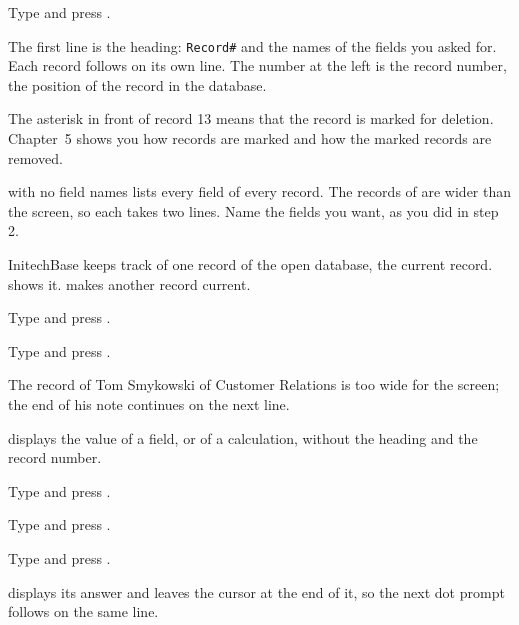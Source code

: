\begin{Steps}[resume]
\item Type  and press .
\end{Steps}
The first line is the heading: \texttt{Record\#} and the names of the fields
you asked for.  Each record follows on its own line.  The number at the left
is the record number, the position of the record in the database.

The asterisk in front of record 13 means that the record is marked for
deletion.  Chapter~5 shows you how records are marked and how the marked
records are removed.

\begin{AteNote}
 with no field names lists every field of every record.  The records
of  are wider than the screen, so each takes two lines.  Name
the fields you want, as you did in step 2.
\end{AteNote}

InitechBase keeps track of one record of the open database, the current
record.   shows it.   makes another record current.
\begin{Steps}[resume]
\item Type  and press .
\item Type  and press .
\end{Steps}
The record of Tom Smykowski of Customer Relations is too wide for the
screen; the end of his note continues on the next line.

 displays the value of a field, or of a calculation, without the
heading and the record number.
\begin{Steps}[resume]
\item Type  and press .
\item Type  and press .
\item Type  and press .
\end{Steps}
 displays its answer and leaves the cursor at the end of it, so the next
dot prompt follows on the same line.

